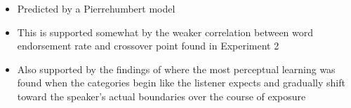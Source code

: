 \begin{itemize}
\item Predicted by a Pierrehumbert model

\item This is supported somewhat by the weaker correlation between word endorsement rate and crossover point found in Experiment 2
	
\item Also supported by the findings of \citet{Sumner2011} where the most perceptual learning was found when the categories begin like the listener expects and gradually shift toward the speaker's actual boundaries over the course of exposure
\end{itemize}

